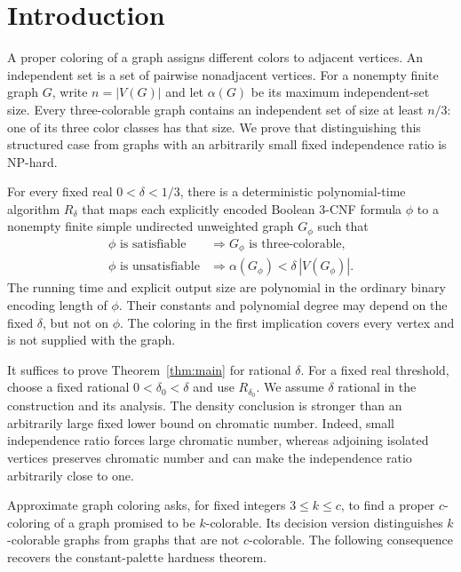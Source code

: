 \section{Introduction}

A proper coloring of a graph assigns different colors to adjacent vertices.
An independent set is a set of pairwise nonadjacent vertices.
For a nonempty finite graph $G$, write $n=|V(G)|$ and let $\alpha(G)$
be its maximum independent-set size.
Every three-colorable graph contains an independent set of size at least
$n/3$: one of its three color classes has that size.
We prove that distinguishing this structured case from graphs with an
arbitrarily small fixed independence ratio is NP-hard.

\begin{theorem}\label{thm:main}
For every fixed real $0<\delta<1/3$, there is a deterministic
polynomial-time algorithm $R_\delta$ that maps each explicitly encoded
Boolean $3$-CNF formula $\phi$ to a nonempty finite simple undirected
unweighted graph $G_\phi$ such that
\[
 \begin{array}{ll}
 \phi\text{ is satisfiable}
   &\Longrightarrow G_\phi\text{ is three-colorable},\\[2pt]
 \phi\text{ is unsatisfiable}
   &\Longrightarrow \alpha(G_\phi)<\delta\,|V(G_\phi)|.
 \end{array}
\]
The running time and explicit output size are polynomial in the ordinary
binary encoding length of $\phi$. Their constants and polynomial degree
may depend on the fixed $\delta$, but not on $\phi$.
The coloring in the first implication covers every vertex and is not
supplied with the graph.
\end{theorem}

It suffices to prove Theorem~\ref{thm:main} for rational $\delta$.
For a fixed real threshold, choose a fixed rational $0<\delta_0<\delta$
and use $R_{\delta_0}$. We assume $\delta$ rational in the construction
and its analysis.
The density conclusion is stronger than an arbitrarily large fixed
lower bound on chromatic number. Indeed, small independence ratio forces
large chromatic number, whereas adjoining isolated vertices preserves
chromatic number and can make the independence ratio arbitrarily close
to one.

Approximate graph coloring asks, for fixed integers $3\le k\le c$,
to find a proper $c$-coloring of a graph promised to be $k$-colorable.
Its decision version distinguishes $k$-colorable graphs from graphs
that are not $c$-colorable. The following consequence recovers the
constant-palette hardness theorem.

